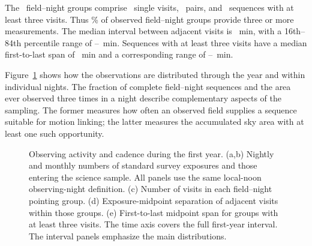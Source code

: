 The \yrNGroups\ field--night groups comprise \yrNOne\ single visits,
\yrNTwo\ pairs, and \yrNThree\ sequences with at least three visits.
Thus \yrFracThree\% of observed field--night groups provide three
or more measurements. The median interval between adjacent visits
is \yrCadence~min, with a 16th--84th percentile range of
\yrCadenceLow--\yrCadenceHigh~min. Sequences with at least three
visits have a median first-to-last span of \yrSpan~min and a
corresponding range of \yrSpanLow--\yrSpanHigh~min.

Figure~\ref{fig:cadence} shows how the observations are distributed
through the year and within individual nights. The fraction of
complete field--night sequences and the area ever observed three
times in a night describe complementary aspects of the sampling.
The former measures how often an observed field supplies a sequence
suitable for motion linking; the latter measures the accumulated
sky area with at least one such opportunity.

\begin{figure}[tbp]
\centering
{}
\caption{Observing activity and cadence during the first year.
(a,b) Nightly and monthly numbers of standard survey exposures
and those entering the science sample. All panels use the same
local-noon observing-night definition. (c) Number of visits in
each field--night pointing group. (d) Exposure-midpoint separation
of adjacent visits within those groups. (e) First-to-last midpoint
span for groups with at least three visits. The time axis covers
the full first-year interval. The interval panels emphasize the
main distributions.}
\label{fig:cadence}
\end{figure}

